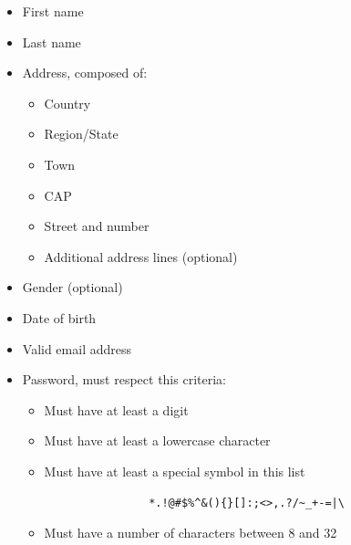 \begin{itemize}
    \item First name
    \item Last name
    \item Address, composed of:
          \begin{itemize}
              \item Country
              \item Region/State
              \item Town
              \item CAP
              \item Street and number
              \item Additional address lines (optional)
          \end{itemize}
    \item Gender (optional)
    \item Date of birth
    \item Valid email address
    \item Password, must respect this criteria:\label{password_req}
          \begin{itemize}
              \item Must have at least a digit
              \item Must have at least a lowercase character
              \item Must have at least a special symbol in this list
                    \begin{verbatim}
                *.!@#$%^&(){}[]:;<>,.?/~_+-=|\
                    \end{verbatim}
              \item Must have a number of characters between 8 and 32
          \end{itemize}
\end{itemize}